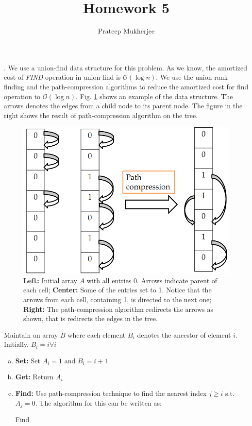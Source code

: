 \documentclass[assign]{article}
\title{Homework 5}
\author{Prateep Mukherjee}
\begin{document}
. We use a union-find data structure for this problem. As we know, the amortized cost of \emph{FIND} operation in union-find is $\mathcal{O}(\log n)$. We use the union-rank finding and the path-compression algorithms to reduce the amortized cost for find operation to $\mathcal{O}(\log n)$. Fig. \ref{fig1} shows an example of the data structure. The arrows denotes the edges from a child node to its parent node. The figure in the right shows the result of path-compression algorithm on the tree.

\begin{figure}[!hbt]
\centering
  \includegraphics[width=0.9\linewidth]{fig1.png}
\caption{\small{ {\bf Left:} Initial array $A$ with all entries 0. Arrows indicate parent of each cell; {\bf Center:} Some of the entries set to 1. Notice that the arrows from each cell, containing 1, is directed to the next one; {\bf Right:} The path-compression algorithm redirects the arrows as shown, that is redirects the edges in the tree.}}
\label{fig1}
\end{figure}

Maintain an array $B$ where each element $B_i$ denotes the ancestor of element $i$. Initially, $B_i = i \forall i$

\begin{enumerate}[a.]
\addtolength{\itemsep}{-8pt}
\item \textbf{Set:} Set $A_i = 1$ and $B_i = i+1$
\item \textbf{Get:} Return $A_i$
\item \textbf{Find:} Use path-compression technique to find the nearest index $j \ge i$ s.t. $A_j = 0$. The algorithm for this can be written as:
\vspace{-5pt}
  \begin{algorithm}
      \caption{Find}
         {
             \;
         } 
	   {
             \;
         } 
   \end{algorithm} 
\end{enumerate}
\end{document}
